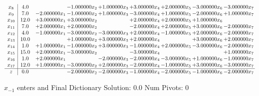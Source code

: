 \documentclass[10pt]{article}
\begin{document}
\[\begin{array}{c| c c@{\hskip 2pt} c@{\hskip 2pt} c@{\hskip 2pt} c@{\hskip 2pt} c@{\hskip 2pt} c@{\hskip 2pt} c@{\hskip 2pt} }
 x_{8}   &  4.0  &   & -1.000000 x_{2} & + 1.000000 x_{3} & + 3.000000 x_{4} & + 2.000000 x_{5} & -3.000000 x_{6} & -3.000000 x_{7}\\
 x_{9}   &  7.0 & -2.000000 x_{1} & -1.000000 x_{2} & + 1.000000 x_{3} & -3.000000 x_{4} & + 1.000000 x_{5} & -2.000000 x_{6} & + 1.000000 x_{7}\\
 x_{10}   &  12.0 & + 3.000000 x_{1} & + 3.000000 x_{2} &   & + 2.000000 x_{4} & + 2.000000 x_{5} & + 1.000000 x_{6} &   \\
 x_{11}   &  7.0 & + 2.000000 x_{1} & + 2.000000 x_{2} &   & -2.000000 x_{4} & + 2.000000 x_{5} & + 3.000000 x_{6} & -2.000000 x_{7}\\
 x_{12}   &  4.0 & -1.000000 x_{1} & -3.000000 x_{2} & -3.000000 x_{3} & + 2.000000 x_{4} & -1.000000 x_{5} & + 2.000000 x_{6} & -2.000000 x_{7}\\
 x_{13}   &  10.0  &   & + 1.000000 x_{2} & + 3.000000 x_{3} & + 2.000000 x_{4} &   & + 3.000000 x_{6} & + 2.000000 x_{7}\\
 x_{14}   &  1.0 & + 1.000000 x_{1} & -1.000000 x_{2} & + 3.000000 x_{3} & -1.000000 x_{4} & + 2.000000 x_{5} & -3.000000 x_{6} & -2.000000 x_{7}\\
 x_{15}   &  15.0 & + 2.000000 x_{1} & -3.000000 x_{2} &   & -3.000000 x_{4} &    &   & + 1.000000 x_{7}\\
 x_{16}   &  1.0 & + 2.000000 x_{1} &   & -2.000000 x_{3} & -2.000000 x_{4} & -3.000000 x_{5} & + 1.000000 x_{6} & -1.000000 x_{7}\\
 x_{17}   &  12.0 & + 1.000000 x_{1} & -3.000000 x_{2} & + 2.000000 x_{3} & -2.000000 x_{4} & -1.000000 x_{5} & + 3.000000 x_{6} & -3.000000 x_{7}\\
\hline
z    &  0.0  &   & -2.000000 x_{2} & -2.000000 x_{3} & -1.000000 x_{4} & -2.000000 x_{5} & -1.000000 x_{6} & -2.000000 x_{7}\\
\end{array}\]


 $ x_{-1} $ enters and Final Dictionary
Solution:  0.0
Num Pivots:  0
\end{document}
